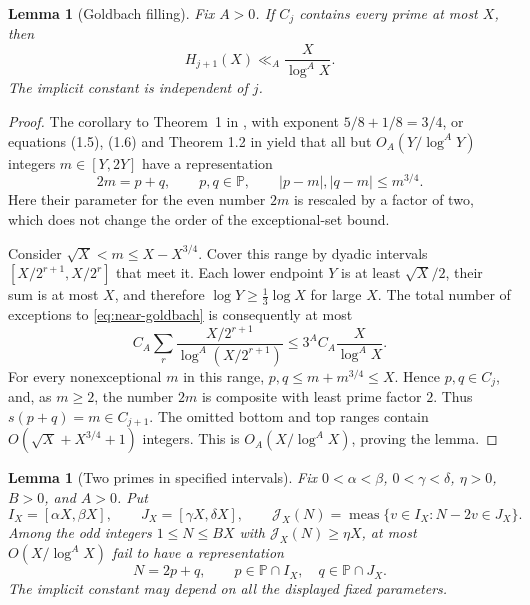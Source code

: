 \documentclass[11pt,letterpaper]{article}
\numberwithin{equation}{section}
\newtheorem{lemma}[theorem]{Lemma}
\theoremstyle{remark}
\DeclareMathOperator{\meas}{meas}
\newcommand{\Pp}{\mathbb P}
\begin{document}
\begin{lemma}[Goldbach filling]\label{lem:filling}
Fix $A>0$. If $C_j$ contains every prime at most $X$, then
\begin{equation}\label{eq:filling}
 H_{j+1}(X)\ll_A\frac{X}{\log^A X}.
\end{equation}
The implicit constant is independent of $j$.
\end{lemma}

\begin{proof}
The corollary to Theorem~1 in \cite{CL}, with exponent $5/8+1/8=3/4$, or equations (1.5), (1.6) and Theorem 1.2 in \cite{BakerHarman1998}
yield that all but
$O_A(Y/\log^A Y)$ integers $m\in[Y,2Y]$ have a representation
\begin{equation}\label{eq:near-goldbach}
 2m=p+q,\qquad p,q\in\Pp,\qquad |p-m|,|q-m|\le m^{3/4}.
\end{equation}
Here their parameter for the even number $2m$ is rescaled by a factor
of two, which does not change the order of the exceptional-set bound.

Consider $\sqrt X<m\le X-X^{3/4}$. Cover this range by dyadic
intervals $[X/2^{r+1},X/2^r]$ that meet it. Each lower endpoint $Y$
is at least $\sqrt X/2$, their sum is at most $X$, and therefore
$\log Y\ge \tfrac13\log X$ for large $X$. The total number of
exceptions to \eqref{eq:near-goldbach} is consequently at most
\[
 C_A\sum_r\frac{X/2^{r+1}}{\log^A(X/2^{r+1})}
 \le 3^AC_A\frac{X}{\log^A X}.
\]
For every nonexceptional $m$ in this range,
$p,q\le m+m^{3/4}\le X$. Hence $p,q\in C_j$, and, as $m\ge2$,
the number $2m$ is composite with least prime factor $2$. Thus
$s(p+q)=m\in C_{j+1}$. The omitted bottom and top ranges contain
$O(\sqrt X+X^{3/4}+1)$ integers. This is $O_A(X/\log^A X)$,
proving the lemma.
\end{proof}

\begin{lemma}[Two primes in specified intervals]\label{lem:binary}
Fix $0<\alpha<\beta$, $0<\gamma<\delta$, $\eta>0$, $B>0$, and $A>0$.
Put
\[
 I_X=[\alpha X,\beta X],\qquad J_X=[\gamma X,\delta X],
 \qquad
 \mathcal J_X(N)=\meas\{v\in I_X:N-2v\in J_X\}.
\]
Among the odd integers $1\le N\le BX$ with
$\mathcal J_X(N)\ge\eta X$, at most $O(X/\log^A X)$ fail to have
a representation
\begin{equation}\label{eq:binary-rep}
 N=2p+q,\qquad p\in\Pp\cap I_X,\quad q\in\Pp\cap J_X.
\end{equation}
The implicit constant may depend on all the displayed fixed parameters.
\end{lemma}
\end{document}
